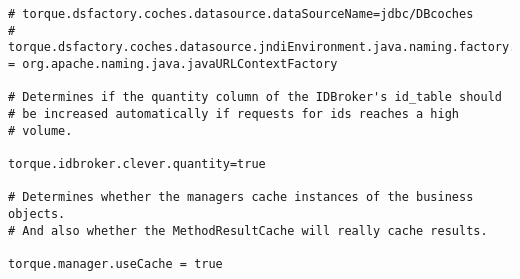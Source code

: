 \begin{lstlisting}
# torque.dsfactory.coches.datasource.dataSourceName=jdbc/DBcoches
# torque.dsfactory.coches.datasource.jndiEnvironment.java.naming.factory.initial = org.apache.naming.java.javaURLContextFactory

# Determines if the quantity column of the IDBroker's id_table should
# be increased automatically if requests for ids reaches a high
# volume.

torque.idbroker.clever.quantity=true

# Determines whether the managers cache instances of the business objects.
# And also whether the MethodResultCache will really cache results.

torque.manager.useCache = true
\end{lstlisting}